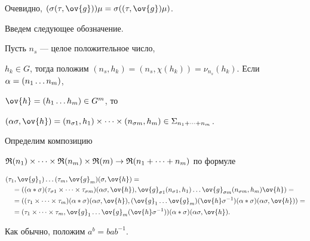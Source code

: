 Очевидно, $(\s (\t,\ov{g}))\mu=\s ((\t,\ov{g})\mu)$.


Введем следующее обозначение.





Пусть $n_s$ --- целое положительное число,


$h_k\in G$, тогда положим $(n_s,h_k)=


(n_s,\chi(h_k))=\nu_{n_s}(h_k)$. Если $\al=(n_1\dotsc n_m)$,


$\ov{h}=(h_1\dotsc h_m)\in G^m$, то


$ (\al\s,\ov{h})=(n_{\s1},h_1) \times \dotsb \times


(n_{\s{m}},h_{m}) \in \sym_{n_1+ \dotsb + n_m}$.








Определим композицию


$\R({n_1}) \times \dotsb \times \R({n_m}) \times \R(m) \to


\R({n_1+ \dotsb +n_m})$ по формуле


\begin{align*}


&(\t_1,\ov{g}_1) \dotsc (\t_m,\ov{g}_m)(\s,\ov{h}) = \\


&\quad=( (\al * \s)(\t_{\s1} \times \dotsb \times \t_{\s{m}})(\al\s,\ov{h}), 


\ov{g}_{\s1}(n_{\s1},h_1) \dotsc \ov{g}_{\s{m}}(n_{\s{m}},h_m) \ov{h})=\\


&\quad=((\t_1 \times \dotsb \times \t_{m}) (\al * \s) (\al\s,\ov{h}), 


(\ov{g}_{1} \dotsc \ov{g}_{m}) (\ov{h} \s^{-1}) (\al * \s)(\al\s,\ov{h}))=\\


&\quad=( \t_1 \times \dotsb \times \t_{m} , \ov{g}_{1} \dotsc


\ov{g}_{m} (\ov{h} \s^{-1}))(\al * \s)(\al\s,\ov{h}).


\end{align*}


Как обычно, положим $a^b=bab^{-1}$.






